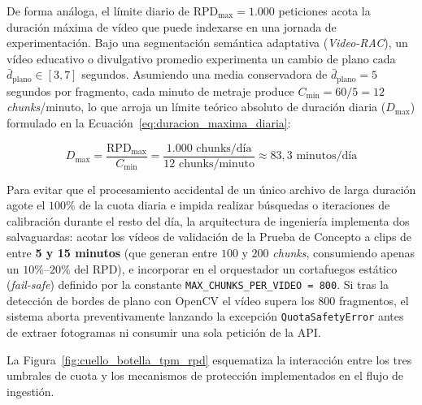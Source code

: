 De forma análoga, el límite diario de $\text{RPD}_{\max} = 1.000$ peticiones acota la duración máxima de vídeo que puede indexarse en una jornada de experimentación. %
Bajo una segmentación semántica adaptativa (\textit{Video-RAC}), un vídeo educativo o divulgativo promedio experimenta un cambio de plano cada $\bar{d}_{\text{plano}} \in [3, 7]$ segundos. %
Asumiendo una media conservadora de $\bar{d}_{\text{plano}} = 5$ segundos por fragmento, cada minuto de metraje produce $C_{\text{min}} = 60 / 5 = 12$ \textit{chunks}/minuto, lo que arroja un límite teórico absoluto de duración diaria ($D_{\max}$) formulado en la Ecuación~\eqref{eq:duracion_maxima_diaria}: %

\begin{equation}
D_{\max} = \frac{\text{RPD}_{\max}}{C_{\text{min}}} = \frac{1.000 \text{ chunks/día}}{12 \text{ chunks/minuto}} \approx 83,3 \text{ minutos/día}
\label{eq:duracion_maxima_diaria}
\end{equation} %

Para evitar que el procesamiento accidental de un único archivo de larga duración agote el $100\%$ de la cuota diaria e impida realizar búsquedas o iteraciones de calibración durante el resto del día, la arquitectura de ingeniería implementa dos salvaguardas: acotar los vídeos de validación de la Prueba de Concepto a clips de entre \textbf{5 y 15 minutos} (que generan entre $100$ y $200$ \textit{chunks}, consumiendo apenas un $10\%\text{--}20\%$ del RPD), e incorporar en el orquestador un cortafuegos estático (\textit{fail-safe}) definido por la constante \texttt{MAX\_CHUNKS\_PER\_VIDEO = 800}. %
Si tras la detección de bordes de plano con OpenCV el vídeo supera los $800$ fragmentos, el sistema aborta preventivamente lanzando la excepción \texttt{QuotaSafetyError} antes de extraer fotogramas ni consumir una sola petición de la API. %

La Figura~\ref{fig:cuello_botella_tpm_rpd} esquematiza la interacción entre los tres umbrales de cuota y los mecanismos de protección implementados en el flujo de ingestión. %


